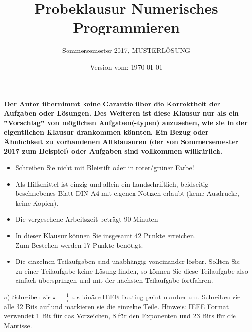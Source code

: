 \documentclass{scrartcl}
\begin{document}
\title{Probeklausur Numerisches Programmieren}
\subtitle{Sommersemester 2017, MUSTERLÖSUNG}
\author{\npauthor{}}
\date{Version vom: \today}
\maketitle

\textbf{Der Autor übernimmt keine Garantie über die Korrektheit der Aufgaben oder Lösungen. \n Des Weiteren ist diese Klausur nur als ein ''Vorschlag'' von möglichen Aufgaben(-typen) anzusehen, wie sie in der eigentlichen Klausur drankommen könnten. Ein Bezug oder Ähnlichkeit zu vorhandenen Altklausuren (der von Sommersemester 2017 zum Beispiel) oder Aufgaben sind vollkommen willkürlich.}
\sbreak

\begin{itemize}
	\item Schreiben Sie nicht mit Bleistift oder in roter/grüner Farbe!
	\item Als Hilfsmittel ist einzig und allein ein handschriftlich, beidseitig beschriebenes Blatt DIN A4 mit eigenen Notizen erlaubt (keine Ausdrucke, keine Kopien).
	\item Die vorgesehene Arbeitszeit beträgt 90 Minuten
	\item In dieser Klausur können Sie insgesamt 42 Punkte erreichen. \\Zum Bestehen werden 17 Punkte benötigt.
	\item Die einzelnen Teilaufgaben sind unabhängig voneinander lösbar.
	Sollten Sie zu einer Teilaufgabe keine Lösung finden, so können Sie diese Teilaufgabe also einfach überspringen und mit der nächsten Teilaufgabe fortfahren.
\end{itemize}


	a) 
	Schreiben sie $x = \frac{1}{7}$ als binäre IEEE floating point number um. Schreiben sie alle 32 Bits auf und markieren sie die einzelne Teile.
	\n
	Hinweis: IEEE Format verwendet 1 Bit für das Vorzeichen, 8 für den Exponenten und 23 Bits für die Mantisse. 
	\lbreak
	\\
\end{document}
